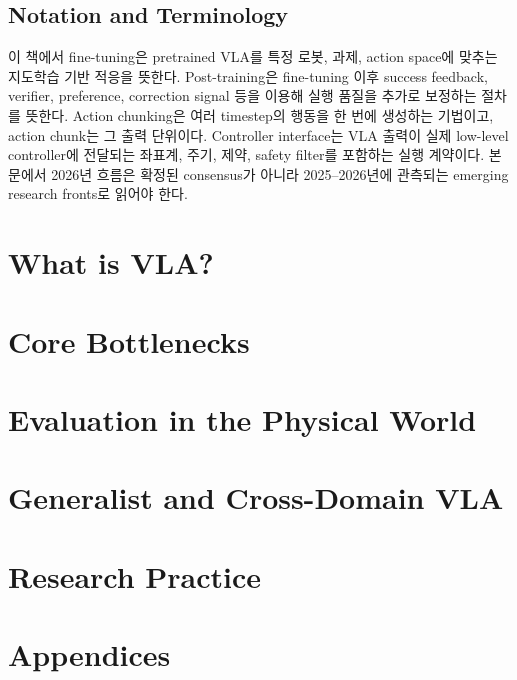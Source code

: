 \documentclass[11pt,a4paper,openany,twoside]{book}
\begin{document}
\chapter*{Notation and Terminology}
이 책에서 fine-tuning은 pretrained VLA를 특정 로봇, 과제, action space에 맞추는 지도학습 기반 적응을 뜻한다. Post-training은 fine-tuning 이후 success feedback, verifier, preference, correction signal 등을 이용해 실행 품질을 추가로 보정하는 절차를 뜻한다. Action chunking은 여러 timestep의 행동을 한 번에 생성하는 기법이고, action chunk는 그 출력 단위이다. Controller interface는 VLA 출력이 실제 low-level controller에 전달되는 좌표계, 주기, 제약, safety filter를 포함하는 실행 계약이다. 본문에서 2026년 흐름은 확정된 consensus가 아니라 2025--2026년에 관측되는 emerging research fronts로 읽어야 한다.

\tableofcontents

\mainmatter
\part{What is VLA?}



\part{Core Bottlenecks}



\part{Evaluation in the Physical World}





\part{Generalist and Cross-Domain VLA}


\part{Research Practice}




\appendix
\part{Appendices}



\end{document}
